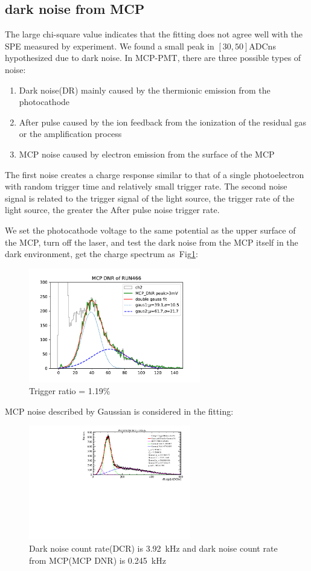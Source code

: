 \documentclass{article}
\begin{document}
\subsection{dark noise from MCP}\label{subsec:dnr}
The large chi-square value indicates that the fitting does not agree well with the SPE measured by experiment. We
found a small peak in $[30,50]$\si[]{ADCns} hypothesized due to dark noise. In MCP-PMT, there are three possible types of noise:
\begin{enumerate}
    \item {Dark noise(DR) mainly caused by the thermionic emission from the
          photocathode\cite{2019wenlj}}
    \item {After pulse caused by the ion feedback from the ionization of
          the residual gas or the amplification process\cite{2019wenlj}}
    \item {MCP noise caused by electron emission from the surface of the MCP}
\end{enumerate}
The first noise creates a charge response similar to that of a single photoelectron with random trigger time
and relatively small trigger rate. The second noise signal is related to the trigger signal of the light source,
the trigger rate of the light source, the greater the After pulse noise trigger rate.

We set the photocathode voltage to the same potential as the upper surface of the MCP, turn off the laser,
and test the dark noise from the MCP itself in the dark environment, get the  charge spectrum as~Fig\ref{fig:MCPDNR}:
\begin{figure}[ht]
    \centering
    \includegraphics[height=5cm]{pic/MCP_DNR.pdf}
    \caption{Trigger ratio = 1.19\%}\label{fig:MCPDNR}
\end{figure}
MCP noise described by Gaussian  is considered in the fitting:
\begin{figure}[ht]
    \centering
    \includegraphics[height=5cm]{pic/gaussDgamma.pdf}
    \caption{Dark noise count rate(DCR) is \SI{3.92}{kHz} and dark noise count rate from MCP(MCP DNR) is \SI{0.245}{kHz}}\label{fig:gausDgam}
\end{figure}
\end{document}
